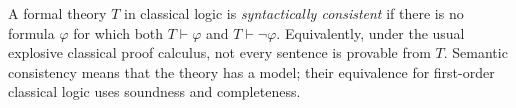 
A formal theory $T$ in classical logic is \emph{syntactically consistent} if there is no formula $\varphi$ for which both $T\vdash\varphi$ and $T\vdash\neg\varphi$. Equivalently, under the usual explosive classical proof calculus, not every sentence is provable from $T$. Semantic consistency means that the theory has a model; their equivalence for first-order classical logic uses soundness and completeness.
